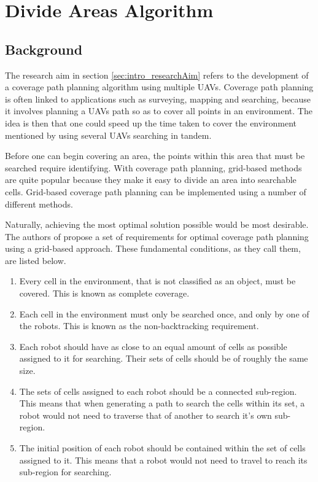 \chapter{Divide Areas Algorithm}
\label{chp:DARP}

\section{Background}
The research aim in section \ref{sec:intro_researchAim} refers to the development of a coverage path planning algorithm using multiple UAVs. Coverage path planning is often linked to applications such as surveying, mapping and searching, because it involves planning a UAVs path so as to cover all points in an environment. The idea is then that one could speed up the time taken to cover the environment mentioned by using several UAVs searching in tandem.

Before one can begin covering an area, the points within this area that must be searched require identifying. With coverage path planning, grid-based methods are quite popular because they make it easy to divide an area into searchable cells.
Grid-based coverage path planning can be implemented using a number of different methods. 

Naturally, achieving the most optimal solution possible would be most desirable. The authors of \cite{DARP2017} propose a set of requirements for optimal coverage path planning using a grid-based approach. These fundamental conditions, as they call them, are listed below.

\begin{enumerate}
	\item Every cell in the environment, that is not classified as an object, must be covered. This is known as complete coverage.
	\item Each cell in the environment must only be searched once, and only by one of the robots. This is known as the non-backtracking requirement.
	\item Each robot should have as close to an equal amount of cells as possible assigned to it for searching. Their sets of cells should be of roughly the same size.
	\item The sets of cells assigned to each robot should be a connected sub-region. This means that when generating a path to search the cells within its set, a robot would not need to traverse that of another to search it's own sub-region.
	\item The initial position of each robot should be contained within the set of cells assigned to it. This means that a robot would not need to travel to reach its sub-region for searching.
\end{enumerate}

